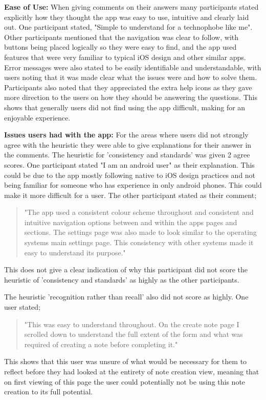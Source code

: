 \documentclass{l4proj}
\begin{document}
\textbf{Ease of Use:} When giving comments on their answers many participants stated explicitly how they thought the app was easy to use, intuitive and clearly laid out. One participant stated, "Simple to understand for a technophobe like me". Other participants mentioned that the navigation was clear to follow, with buttons being placed logically so they were easy to find, and the app used features that were very familiar to typical iOS design and other similar apps. Error messages were also stated to be easily identifiable and understandable, with users noting that it was made clear what the issues were and how to solve them. Participants also noted that they appreciated the extra help icons as they gave more direction to the users on how they should be answering the questions. This shows that generally users did not find using the app difficult, making for an enjoyable experience. 

\textbf{Issues users had with the app:} For the areas where users did not strongly agree with the heuristic they were able to give explanations for their answer in the comments. The heuristic for 'consistency and standards' was given 2 agree scores. One participant stated "I am an android user" as their explanation. This could be due to the app mostly following native to iOS design practices and not being familiar for someone who has experience in only android phones. This could make it more difficult for a user. The other participant stated as their comment; \begin{quotation}"The app used a consistent colour scheme throughout and consistent and intuitive navigation options between and within the apps pages and sections. The settings page was also made to look similar to the operating systems main settings page. This consistency with other systems made it easy to understand its purpose."\end{quotation} This does not give a clear indication of why this participant did not score the heuristic of 'consistency and standards' as highly as the other participants.

The heuristic 'recognition rather than recall' also did not score as highly. One user stated; \begin{quotation}"This was easy to understand throughout. On the create note page I scrolled down to understand the full extent of the form and what was required of creating a note before completing it."\end{quotation} This shows that this user was unsure of what would be necessary for them to reflect before they had looked at the entirety of note creation view, meaning that on first viewing of this page the user could potentially not be using this note creation to its full potential. 
\end{document}
